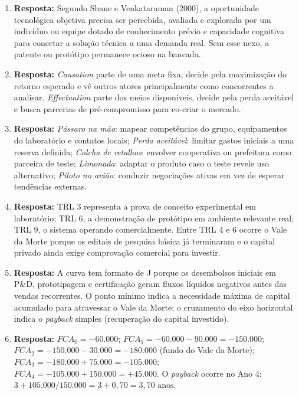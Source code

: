 \begin{boxGabarito}
  \begin{enumerate}[leftmargin=1.5em, itemsep=4pt]
    \item \textbf{Resposta:} Segundo Shane e Venkataraman (2000), a oportunidade tecnológica objetiva precisa ser percebida, avaliada e explorada por um indivíduo ou equipe dotado de conhecimento prévio e capacidade cognitiva para conectar a solução técnica a uma demanda real. Sem esse nexo, a patente ou protótipo permanece ocioso na bancada.
    \item \textbf{Resposta:} \textit{Causation} parte de uma meta fixa, decide pela maximização do retorno esperado e vê outros atores principalmente como concorrentes a analisar. \textit{Effectuation} parte dos meios disponíveis, decide pela perda aceitável e busca parcerias de pré-compromisso para co-criar o mercado.
    \item \textbf{Resposta:} \textit{Pássaro na mão}: mapear competências do grupo, equipamentos do laboratório e contatos locais; \textit{Perda aceitável}: limitar gastos iniciais a uma reserva definida; \textit{Colcha de retalhos}: envolver cooperativa ou prefeitura como parceira de teste; \textit{Limonada}: adaptar o produto caso o teste revele uso alternativo; \textit{Piloto no avião}: conduzir negociações ativas em vez de esperar tendências externas.
    \item \textbf{Resposta:} TRL 3 representa a prova de conceito experimental em laboratório; TRL 6, a demonstração de protótipo em ambiente relevante real; TRL 9, o sistema operando comercialmente. Entre TRL 4 e 6 ocorre o Vale da Morte porque os editais de pesquisa básica já terminaram e o capital privado ainda exige comprovação comercial para investir.
    \item \textbf{Resposta:} A curva tem formato de J porque os desembolsos iniciais em P\&D, prototipagem e certificação geram fluxos líquidos negativos antes das vendas recorrentes. O ponto mínimo indica a necessidade máxima de capital acumulado para atravessar o Vale da Morte; o cruzamento do eixo horizontal indica o \textit{payback} simples (recuperação do capital investido).
    \item \textbf{Resposta:} $FCA_0 = -60.000$; $FCA_1 = -60.000 - 90.000 = -150.000$; $FCA_2 = -150.000 - 30.000 = -180.000$ (fundo do Vale da Morte); $FCA_3 = -180.000 + 75.000 = -105.000$; $FCA_4 = -105.000 + 150.000 = +45.000$. O \textit{payback} ocorre no Ano 4: $3 + 105.000 / 150.000 = 3 + 0{,}70 = 3{,}70\text{ anos}$.

\end{enumerate}
\end{boxGabarito}
